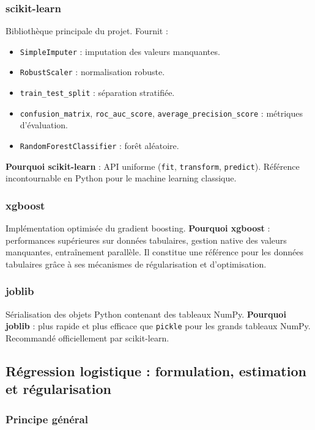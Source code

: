 \documentclass[12pt,a4paper]{report}
\begin{document}
\subsubsection{scikit-learn}

Bibliothèque principale du projet. Fournit :
\begin{itemize}[leftmargin=1.5em]
 \item \texttt{SimpleImputer} : imputation des valeurs manquantes.
 \item \texttt{RobustScaler} : normalisation robuste.
 \item \texttt{train\_test\_split} : séparation stratifiée.
 \item \texttt{confusion\_matrix}, \texttt{roc\_auc\_score},
 \texttt{average\_precision\_score} : métriques d'évaluation.
 \item \texttt{RandomForestClassifier} : forêt aléatoire.
\end{itemize}
\textbf{Pourquoi scikit-learn} : API uniforme (\texttt{fit}, \texttt{transform},
\texttt{predict}). Référence incontournable en Python pour le machine learning classique.

\subsubsection{xgboost}

Implémentation optimisée du gradient boosting. \textbf{Pourquoi xgboost} : performances
supérieures sur données tabulaires, gestion native des valeurs manquantes, entraînement
parallèle. Il constitue une référence pour les données tabulaires grâce à ses mécanismes de régularisation et d'optimisation.

\subsubsection{joblib}

Sérialisation des objets Python contenant des tableaux NumPy. \textbf{Pourquoi joblib} :
plus rapide et plus efficace que \texttt{pickle} pour les grands tableaux NumPy.
Recommandé officiellement par scikit-learn.

\subsection{Régression logistique : formulation, estimation et régularisation}

\subsubsection{Principe général}
\end{document}

